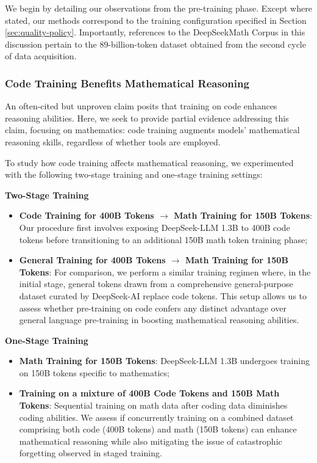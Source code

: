 \begin{itemize}[topsep=0pt]
\begin{itemize}[topsep=0pt]
We begin by detailing our observations from the pre-training phase. Except where stated, our methods correspond to the training configuration specified in Section \ref{sec:quality-policy}. Importantly, references to the DeepSeekMath Corpus in this discussion pertain to the 89-billion-token dataset obtained from the second cycle of data acquisition.

\subsubsection{Code Training Benefits Mathematical Reasoning}

An often-cited but unproven claim posits that training on code enhances reasoning abilities. Here, we seek to provide partial evidence addressing this claim, focusing on mathematics: code training augments models’ mathematical reasoning skills, regardless of whether tools are employed.

To study how code training affects mathematical reasoning, we experimented with the following two-stage training and one-stage training settings:

\textbf{Two-Stage Training}

\begin{itemize}[topsep=0pt]
    \item \textbf{Code Training for 400B Tokens $\rightarrow$ Math Training for 150B Tokens}: Our procedure first involves exposing DeepSeek-LLM 1.3B to 400B code tokens before transitioning to an additional 150B math token training phase;
    \item \textbf{General Training for 400B Tokens $\rightarrow$ Math Training for 150B Tokens}: For comparison, we perform a similar training regimen where, in the initial stage, general tokens drawn from a comprehensive general-purpose dataset curated by DeepSeek-AI replace code tokens. This setup allows us to assess whether pre-training on code confers any distinct advantage over general language pre-training in boosting mathematical reasoning abilities.
\end{itemize}

\textbf{One-Stage Training}

\begin{itemize}[topsep=0pt]
    \item \textbf{Math Training for 150B Tokens}: DeepSeek-LLM 1.3B undergoes training on 150B tokens specific to mathematics;
    \item \textbf{Training on a mixture of 400B Code Tokens and 150B Math Tokens}: Sequential training on math data after coding data diminishes coding abilities. We assess if concurrently training on a combined dataset comprising both code (400B tokens) and math (150B tokens) can enhance mathematical reasoning while also mitigating the issue of catastrophic forgetting observed in staged training.
\end{itemize}


\end{itemize}
\end{itemize}

